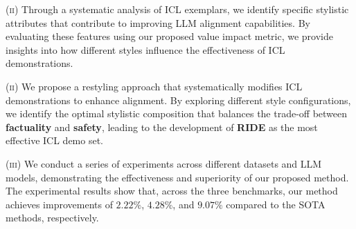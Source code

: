 \textsc{(ii)} Through a systematic analysis of ICL exemplars, we identify specific stylistic attributes that contribute to improving LLM alignment capabilities. By evaluating these features using our proposed value impact metric, we provide insights into how different styles influence the effectiveness of ICL demonstrations.

\textsc{(ii)} We propose a restyling approach that systematically modifies ICL demonstrations to enhance alignment. By exploring different style configurations, we identify the optimal stylistic composition that balances the trade-off between  \textbf{\color{myblue} factuality} and \textbf{\color{myred} safety}, leading to the development of \textbf{RIDE} as the most effective ICL demo set.

\textsc{(iii)} We conduct a series of experiments across different datasets and LLM models, demonstrating the effectiveness and superiority of our proposed method. The experimental results show that, across the three benchmarks, our method achieves improvements of $2.22\%$, $4.28\%$, and $9.07\%$ compared to the SOTA methods, respectively.